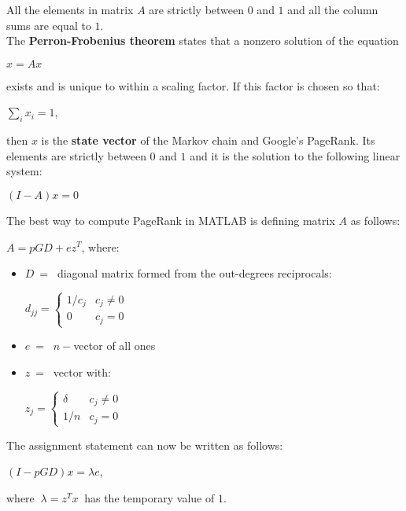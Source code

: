 \documentclass{article}
\begin{document}
All the elements in matrix $A$ are strictly between $0$ and $1$ and all the column sums are equal to $1$. \\
The \textbf{Perron-Frobenius theorem} states that a nonzero solution of the equation
\begin{center}
    $x = Ax$
\end{center}
exists and is unique to within a scaling factor. If this factor is chosen so that:
\begin{center}
    $\displaystyle\sum_i x_i = 1$,
\end{center}
then $x$ is the \textbf{state vector} of the Markov chain and Google's PageRank. Its elements are strictly between $0$ and $1$ and it is the solution to the following linear system:
\begin{center}
    $(I - A)x = 0$
\end{center}
The best way to compute PageRank in MATLAB is defining matrix $A$ as follows:
\begin{center}
    $A = p GD + ez^T$, where:
\end{center}
\begin{itemize}
    \item $D\ = \ $ diagonal matrix formed from the out-degrees reciprocals:
        \begin{center}
            $d_{jj} = 
            \begin{cases}
                1/ c_j & c_j \neq 0 \\
                0 & c_j = 0
            \end{cases}$
        \end{center}
    \item $e \ = \ $ $n-$vector of all ones
    \item $z \ = \ $ vector with:
        \begin{center}
            $z_j = 
            \begin{cases}
                \delta & c_j \neq 0 \\
                1/n & c_j = 0
            \end{cases}$
        \end{center}
\end{itemize}
The assignment statement can now be written as follows:
\begin{center}
    $(I - pGD)x = \lambda e$,
\end{center}
where $ \ \lambda = z^Tx \ $ has the temporary value of $1$.
\end{document}
